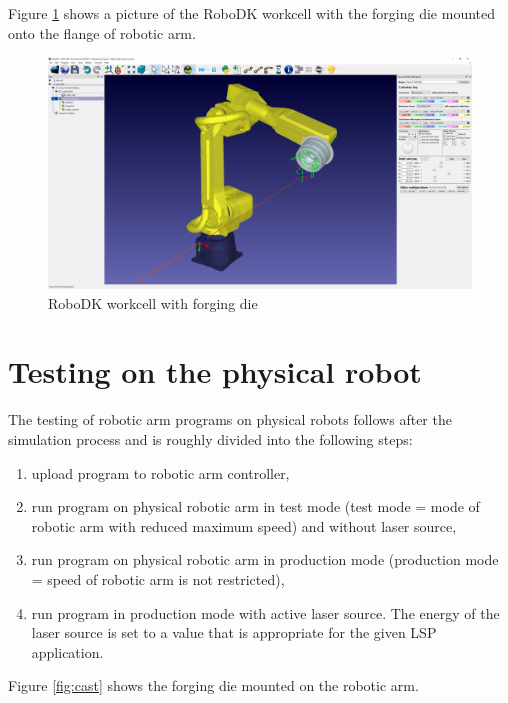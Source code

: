Figure \ref{fig:robodk_die} shows a picture of the RoboDK workcell with the forging die mounted onto the flange of robotic arm.

\begin{figure}[h]
    \centering
    \includegraphics[width=1.0\linewidth]{img/robodk_cast.PNG}
    \caption{RoboDK workcell with forging die}
    \label{fig:robodk_die}
\end{figure}


\section{Testing on the physical robot}

The testing of robotic arm programs on physical robots follows after the simulation process and is roughly divided into the following steps:

\begin{enumerate}
    
\item upload program to robotic arm controller,

\item run program on physical robotic arm in test mode (test mode = mode of robotic arm with reduced maximum speed) and without laser source,

\item run program on physical robotic arm in production mode (production mode = speed of robotic arm is not restricted),

\item run program in production mode with active laser source. The energy of the laser source is set to a value that is appropriate for the given LSP application. 

\end{enumerate}

Figure \ref{fig:cast} shows the forging die mounted on the robotic arm.

